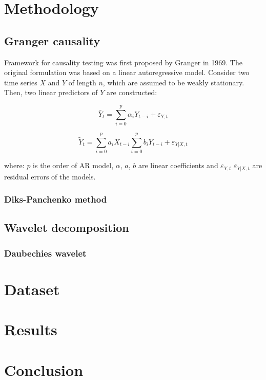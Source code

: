 \section{Methodology} \label{methodology}

\subsection{Granger causality} \label{granger-causality}
Framework for causality testing was first proposed by Granger \cite{granger69} in 1969.
The original formulation was based on a linear autoregressive model.
Consider two time series $X$ and $Y$ of length $n$, which are assumed to be weakly stationary.
Then, two linear predictors of $Y$ are constructed:

\begin{equation}
\bar{Y}_t = \sum_{i=0}^{p} \alpha_i Y_{t-i} + \varepsilon_{Y,t}
\end{equation}

\begin{equation}
\tilde{Y}_t = \sum_{i=0}^{p} a_i X_{t-i} \sum_{i=0}^{p} b_i Y_{t-i} + \varepsilon_{Y|X,t}
\end{equation}

where: $p$ is the order of AR model, $\alpha$, $a$, $b$ are linear coefficients and $\varepsilon_{Y,t}$ $\varepsilon_{Y|X,t}$ are residual errors of the models.

\subsubsection{Diks-Panchenko method}

\subsection{Wavelet decomposition}
\subsubsection{Daubechies wavelet}

\section{Dataset} \label{data}

\section{Results} \label{results}

\section{Conclusion} \label{conclusion}
